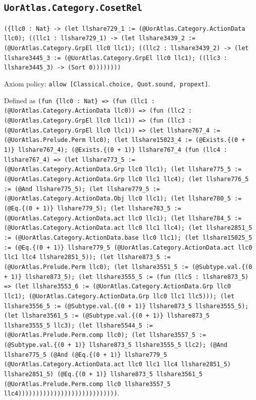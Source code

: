\documentclass[11pt]{article}
\begin{document}
\subsection*{\texttt{UorAtlas.Category.CosetRel}}
\noindent\texttt{(\{llc0 : Nat\} -> (let llshare729\_1 := (@UorAtlas.Category.ActionData llc0); ((llc1 : llshare729\_1) -> (let llshare3439\_2 := (@UorAtlas.Category.GrpEl llc0 llc1); ((llc2 : llshare3439\_2) -> (let llshare3445\_3 := (@UorAtlas.Category.GrpEl llc0 llc1); ((llc3 : llshare3445\_3) -> (Sort 0))))))))}\par
\noindent Axiom policy: \texttt{allow [Classical.choice, Quot.sound, propext]}.\par
\noindent Defined as \texttt{(fun \{llc0 : Nat\} => (fun (llc1 : (@UorAtlas.Category.ActionData llc0)) => (fun (llc2 : (@UorAtlas.Category.GrpEl llc0 llc1)) => (fun (llc3 : (@UorAtlas.Category.GrpEl llc0 llc1)) => (let llshare767\_4 := (@UorAtlas.Prelude.Perm llc0); (let llshare15023\_4 := (@Exists.\{(0 + 1)\} llshare767\_4); (@Exists.\{(0 + 1)\} llshare767\_4 (fun (llc4 : llshare767\_4) => (let llshare773\_5 := (@UorAtlas.Category.ActionData.Grp llc0 llc1); (let llshare775\_5 := (@UorAtlas.Category.ActionData.Grp llc0 llc1 llc4); (let llshare776\_5 := (@And llshare775\_5); (let llshare779\_5 := (@UorAtlas.Category.ActionData.Obj llc0 llc1); (let llshare780\_5 := (@Eq.\{(0 + 1)\} llshare779\_5); (let llshare783\_5 := (@UorAtlas.Category.ActionData.act llc0 llc1); (let llshare784\_5 := (@UorAtlas.Category.ActionData.act llc0 llc1 llc4); (let llshare2851\_5 := (@UorAtlas.Category.ActionData.base llc0 llc1); (let llshare15025\_5 := (@Eq.\{(0 + 1)\} llshare779\_5 (@UorAtlas.Category.ActionData.act llc0 llc1 llc4 llshare2851\_5)); (let llshare873\_5 := (@UorAtlas.Prelude.Perm llc0); (let llshare3551\_5 := (@Subtype.val.\{(0 + 1)\} llshare873\_5); (let llshare3555\_5 := (fun (llc5 : llshare873\_5) => (let llshare3553\_6 := (@UorAtlas.Category.ActionData.Grp llc0 llc1); (@UorAtlas.Category.ActionData.Grp llc0 llc1 llc5))); (let llshare3556\_5 := (@Subtype.val.\{(0 + 1)\} llshare873\_5 llshare3555\_5); (let llshare3561\_5 := (@Subtype.val.\{(0 + 1)\} llshare873\_5 llshare3555\_5 llc3); (let llshare5544\_5 := (@UorAtlas.Prelude.Perm.comp llc0); (let llshare3557\_5 := (@Subtype.val.\{(0 + 1)\} llshare873\_5 llshare3555\_5 llc2); (@And llshare775\_5 (@And (@Eq.\{(0 + 1)\} llshare779\_5 (@UorAtlas.Category.ActionData.act llc0 llc1 llc4 llshare2851\_5) llshare2851\_5) (@Eq.\{(0 + 1)\} llshare873\_5 llshare3561\_5 (@UorAtlas.Prelude.Perm.comp llc0 llshare3557\_5 llc4))))))))))))))))))))))))))))}.\par
\end{document}
